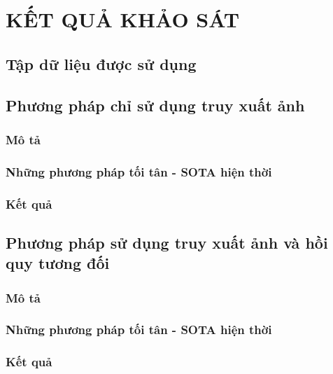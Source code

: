 \chapter{KẾT QUẢ KHẢO SÁT}
\section{Tập dữ liệu được sử dụng}

\section{Phương pháp chỉ sử dụng truy xuất ảnh}
\subsection{Mô tả}
\subsection{Những phương pháp tối tân - SOTA hiện thời}
\subsection{Kết quả}
\section{Phương pháp sử dụng truy xuất ảnh và hồi quy tương đối}
\subsection{Mô tả}
\subsection{Những phương pháp tối tân - SOTA hiện thời}
\subsection{Kết quả}